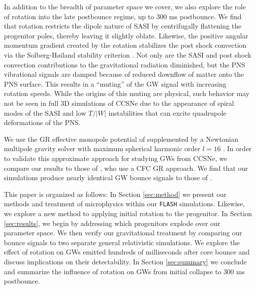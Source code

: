 \documentclass[twocolumn,times]{aastex62}  %
\begin{document}
In addition to the breadth of parameter space we cover, we also explore the role of rotation into the late postbounce regime, up to 300 ms postbounce.  
We find that rotation restricts the dipole nature of SASI by centrifugally flattening the progenitor poles, thereby leaving it slightly oblate. Likewise, the positive angular momentum gradient created by the rotation stabilizes the post shock convection via the Solberg-H{\o}iland stability criterion \citep{endal:1978,fryer:2000}.  Not only are the SASI and post shock convection contributions to the gravitational radiation diminished, but the PNS vibrational signals are damped because of reduced downflow of matter onto the PNS surface.  
This results in a ``muting'' of the GW signal with increasing rotation speeds.
While the origins of this muting are physical, such behavior may not be seen in full 3D simulations of CCSNe due to the appearance of spiral modes of the SASI and low $T/|W|$ instabilities that can excite quadrupole deformations of the PNS. 

We use the GR effective monopole potential of \citet{marek:2006} supplemented by a Newtonian multipole gravity solver with maximum spherical harmonic order $l=16$ \citep{couch:2013a, oconnor:2018}.
In order to validate this approximate approach for studying GWs from CCSNe, we compare our results to those of \citet{richers:2017}, who use a CFC GR approach.  We find that our simulations produce nearly identical GW bounce signals to those of \citet{richers:2017}.  

This paper is organized as follows:  In Section \ref{sec:method} we present our methods and treatment of microphysics within our \texttt{FLASH} simulations.  Likewise, we explore a new method to applying initial rotation to the progenitor.  In Section \ref{sec:results}, we begin by addressing which progenitors explode over our parameter space.  We then verify our gravitational treatment by comparing our bounce signals to two separate general relativistic simulations.  We explore the effect of rotation on GWs emitted hundreds of milliseconds after core bounce and discuss implications on their detectability.  In Section \ref{sec:summary} we conclude and summarize the influence of rotation on GWs from initial collapse to 300 ms postbounce. 

\end{document}
